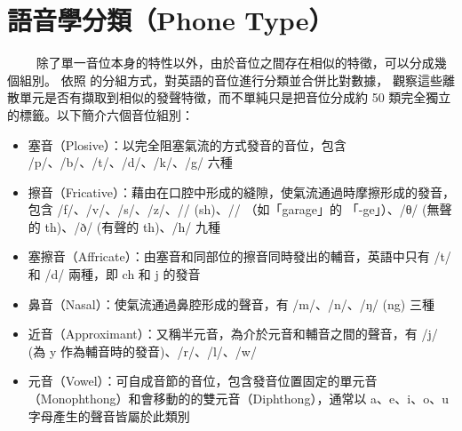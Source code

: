 
\section{語音學分類（Phone Type）}

　　
除了單一音位本身的特性以外，由於音位之間存在相似的特徵，可以分成幾個組別。
依照 \cite{10097097, abdullah23_interspeech} 的分組方式，對英語的音位進行分類並合併比對數據，
觀察這些離散單元是否有擷取到相似的發聲特徵，而不單純只是把音位分成約 50 類完全獨立的標籤。以下簡介六個音位組別：



\begin{itemize}
    \item 塞音（Plosive）：以完全阻塞氣流的方式發音的音位，包含 /p/、/b/、/t/、/d/、/k/、/g/ 六種
    \item 擦音（Fricative）：藉由在口腔中形成的縫隙，使氣流通過時摩擦形成的發音，包含 /f/、/v/、/s/、/z/、/\textesh/ (sh)、/\textyogh/ （如「garage」的 「-ge」）、/θ/ (無聲的 th)、/ð/ (有聲的 th)、/h/ 九種
    \item 塞擦音（Affricate）：由塞音和同部位的擦音同時發出的輔音，英語中只有 /t\textesh/ 和 /d\textyogh/ 兩種，即 ch 和 j 的發音
    \item 鼻音（Nasal）：使氣流通過鼻腔形成的聲音，有 /m/、/n/、/ŋ/ (ng) 三種
    \item 近音（Approximant）：又稱半元音，為介於元音和輔音之間的聲音，有 /j/ (為 y 作為輔音時的發音)、/r/、/l/、/w/
    \item 元音（Vowel）：可自成音節的音位，包含發音位置固定的單元音（Monophthong）和會移動的的雙元音（Diphthong），通常以 a、e、i、o、u 字母產生的聲音皆屬於此類別
\end{itemize}






